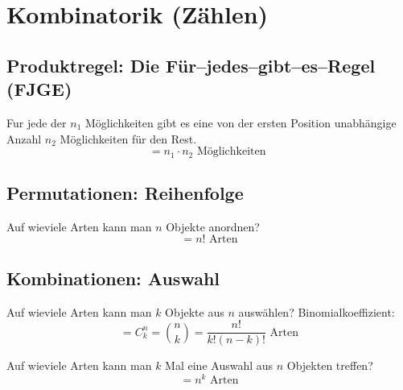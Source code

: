 \section{Kombinatorik (Zählen)}

\subsection{Produktregel: Die Für–jedes–gibt–es–Regel (FJGE)}
Fur jede der $n_1$ Möglichkeiten gibt es eine von der
ersten Position unabhängige Anzahl $n_2$ Möglichkeiten für den Rest.
\[ = n_1 \cdot n_2 \text{ Möglichkeiten } \]

\subsection{Permutationen: Reihenfolge}
Auf wieviele Arten kann man $n$ Objekte anordnen?
\[ = n! \text{ Arten} \]

\subsection{Kombinationen: Auswahl}
Auf wieviele Arten kann man $k$ Objekte aus $n$ auswählen?
Binomialkoeffizient:
\[ = C^n_k=\binom{n}{k} = \frac{n!}{k!(n-k)!} \text{ Arten} \]

Auf wieviele Arten kann man $k$ Mal eine Auswahl aus $n$ Objekten
treffen?
\[ = n^k \text{ Arten} \]
